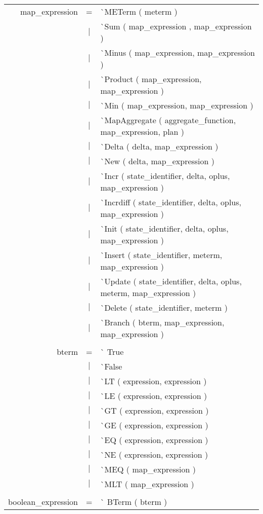 \documentclass{article}
\begin{document}
\begin{tabular}[ht] {rcl}
map\_expression &=& \`{}METerm ( meterm ) \\
&$\lvert$ & \`{}Sum ( map\_expression , map\_expression )\\
&$\lvert$ & \`{}Minus ( map\_expression,  map\_expression )\\
&$\lvert$ & \`{}Product ( map\_expression, map\_expression )\\
&$\lvert$ & \`{}Min ( map\_expression, map\_expression )\\
&$\lvert$ & \`{}MapAggregate ( aggregate\_function, map\_expression, plan )\\
&$\lvert$ & \`{}Delta ( delta,  map\_expression )\\
&$\lvert$ & \`{}New ( delta, map\_expression )\\
&$\lvert$ & \`{}Incr ( state\_identifier, delta, oplus, map\_expression )\\
&$\lvert$ & \`{}Incrdiff ( state\_identifier, delta, oplus, map\_expression )\\
&$\lvert$ & \`{}Init ( state\_identifier, delta, oplus, map\_expression )\\
&$\lvert$ & \`{}Insert ( state\_identifier, meterm, map\_expression )\\
&$\lvert$ & \`{}Update ( state\_identifier, delta, oplus, meterm, map\_expression )\\
&$\lvert$ & \`{}Delete ( state\_identifier, meterm )\\
&$\lvert$ & \`{}Branch ( bterm, map\_expression, map\_expression ) \\
\\
bterm &=& \`{} True \\
&$\lvert$ & \`{}False \\
&$\lvert$ & \`{}LT ( expression,  expression )\\
&$\lvert$ & \`{}LE ( expression, expression )\\
&$\lvert$ & \`{}GT ( expression, expression )\\
&$\lvert$ & \`{}GE ( expression, expression )\\
&$\lvert$ & \`{}EQ ( expression, expression )\\
&$\lvert$ & \`{}NE ( expression, expression )\\
&$\lvert$ & \`{}MEQ ( map\_expression )\\
&$\lvert$ & \`{}MLT ( map\_expression )\\
\\
boolean\_expression &=& \`{} BTerm ( bterm )\\

\end{tabular}
\end{document}

